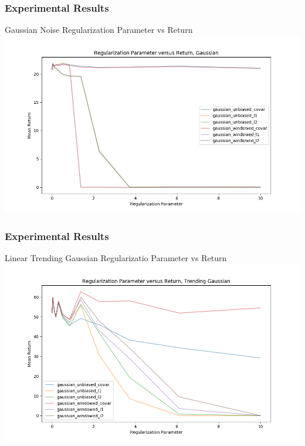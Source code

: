 \documentclass{beamer}
\begin{document}
\begin{frame}
    \frametitle{Experimental Results}

    \begin{block}{Gaussian Noise Regularization Parameter vs Return}
        \includegraphics[width=\linewidth]{gammma_vs_return-Gaussian.png}
    \end{block}

\end{frame}

\begin{frame}
    \frametitle{Experimental Results}

    \begin{block}{Linear Trending Gaussian Regularizatio Parameter vs Return}
        \includegraphics[width=\linewidth]{gammma_vs_return-Trending-Gaussian.png}
    \end{block}

\end{frame}
\end{document}
